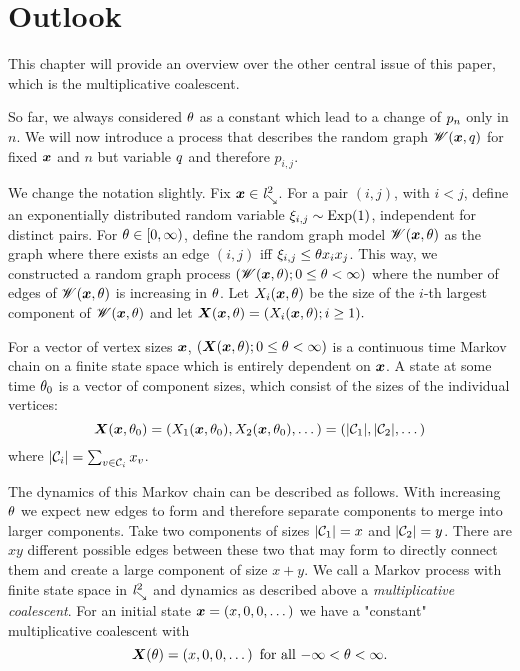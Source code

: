 
\chapter{Outlook} \label{C: outlook}

This chapter will provide an overview over the other central issue of this paper,
which is the multiplicative coalescent.


So far, we always considered $\theta$ as a constant which lead to a change of $p_n$ only in $n$.
We will now introduce a process that describes the random graph $\mathscr{W}(\boldsymbol{x}, q)$ for fixed $\boldsymbol{x}$ and $n$
but variable $q$ and therefore $p_{i,j}$.

We change the notation slightly.
Fix $\boldsymbol{x} \in \mathit{l}^2_{\searrow}$.
For a pair $(i,j)$, with $i < j$, 
define an exponentially distributed random variable $\xi_{i,j} \sim \operatorname*{Exp}(1)$,
independent for distinct pairs.
For $\theta \in [0, \infty)$, define the random graph model $\mathscr{W}(\boldsymbol{x}, \theta)$ as the graph where there exists an edge $(i,j)$ 
iff $\xi_{i,j} \leq \theta x_i x_j$.
This way, we constructed a random graph process $(\mathscr{W}(\boldsymbol{x}, \theta); 0 \leq \theta < \infty)$ 
where the number of edges of $\mathscr{W}(\boldsymbol{x}, \theta)$ is increasing in $\theta$.
Let $X_i(\boldsymbol{x}, \theta)$ be the size of the $i$-th largest component of $\mathscr{W}(\boldsymbol{x}, \theta)$ and let
\begin{math}
	\boldsymbol{X}(\boldsymbol{x}, \theta) = (X_i(\boldsymbol{x}, \theta); i \geq 1).
\end{math}

For a vector of vertex sizes $\boldsymbol{x}$, $(\boldsymbol{X}(\boldsymbol{x}, \theta); 0 \leq \theta < \infty)$ is a continuous time Markov chain
on a finite state space which is entirely dependent on $\boldsymbol{x}$.
A state at some time $\theta_0$ is a vector of component sizes, which consist of the sizes of the individual vertices:
\begin{equation}
	\boldsymbol{X}(\boldsymbol{x}, \theta_0) = (X_1(\boldsymbol{x}, \theta_0), X_2(\boldsymbol{x}, \theta_0), \dots) = (|\mathcal{C}_1|, |\mathcal{C}_2|, \dots)
\end{equation}
where $|\mathcal{C}_i| = \sum_{v \in \mathcal{C}_i} x_v$.

The dynamics of this Markov chain can be described as follows.
With increasing $\theta$ we expect new edges to form and therefore separate components to merge into larger components.
Take two components of sizes $|\mathcal{C}_1| = x$ and $|\mathcal{C}_2| = y$.
There are $xy$ different possible edges between these two that may form to directly connect them 
and create a large component of size $x+y$.
We call a Markov process with finite state space in $\mathit{l}^2_{\searrow}$ and dynamics as described above a \emph{multiplicative coalescent}.
For an initial state $\boldsymbol{x} = (x, 0, 0, \dots)$ we have a "constant" multiplicative coalescent with
\begin{equation}
	\boldsymbol{X}(\theta) = (x, 0, 0, \dots) \enspace \text{for all $-\infty < \theta < \infty$}.
\end{equation}

